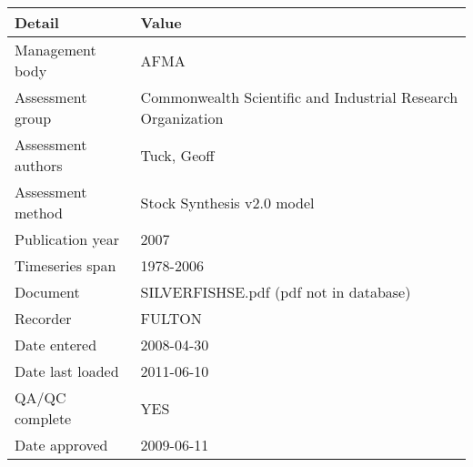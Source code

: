 \begin{table}[htb]
\centering
\begin{tabular}{lp{7cm}}
\toprule
Detail & Value \\
\midrule
Management body    & AFMA                                                         \\
Assessment group   & Commonwealth Scientific and Industrial Research Organization \\
Assessment authors & Tuck, Geoff                                                  \\
Assessment method  & Stock Synthesis v2.0 model                                   \\
Publication year   & 2007                                                         \\
Timeseries span    & 1978-2006                                                    \\
Document           & SILVERFISHSE.pdf (pdf not in database)                       \\
Recorder           & FULTON                                                       \\
Date entered       & 2008-04-30                                                   \\
Date last loaded   & 2011-06-10                                                   \\
QA/QC complete     & YES                                                          \\
Date approved      & 2009-06-11                                                   \\
\bottomrule
\end{tabular}
\label{tab:assessdet}
\end{table}
